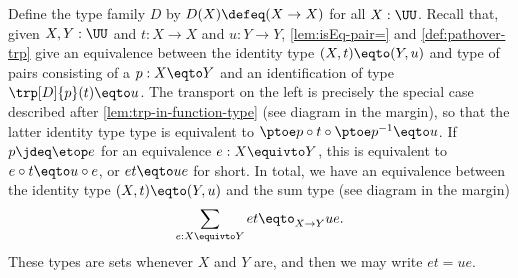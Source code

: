 Define the type family $D$ by $D(X) \defeq (X\to X)$ for all $X:\UU$.
Recall that, given $X,Y:\UU$ and $t:X\to X$ and $u:Y\to Y$,
\cref{lem:isEq-pair=} and \cref{def:pathover-trp} give
an equivalence between the identity type $(X,t)\eqto (Y,u)$ and
type of pairs consisting of a $p:X\eqto Y$ and an identification
of type $\trp[D]{p}(t)\eqto u$. The transport on the left is precisely
the special case described after \cref{lem:trp-in-function-type}
(see diagram in the margin),
so that the latter identity type
type is equivalent to $\ptoe p\circ t\circ \ptoe p^{-1} \eqto u$.
If $p\jdeq\etop e$ for an equivalence $e:X\equivto Y$,
this is equivalent to $e\circ t \eqto u\circ e$, or $e t \eqto u e$ for short.
In total, we have an equivalence between the identity type 
$(X,t)\eqto(Y,u)$ and the sum type (see diagram in the margin)
\[
  \sum_{e: X\equivto Y} et \eqto_{X\to Y} ue.
\]
These types are sets whenever $X$ and $Y$ are, and then we
may write $et = ue$. 
